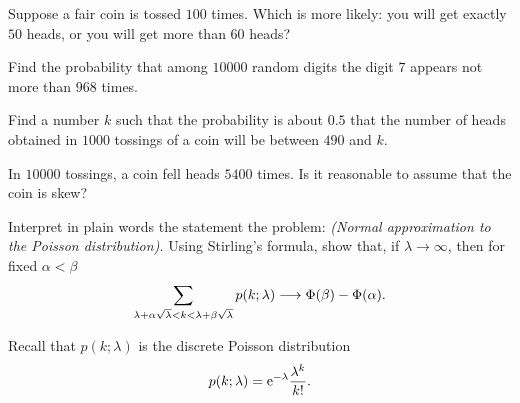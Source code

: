 \begin{problem}
  Suppose a fair coin is tossed \(100\) times. Which is more likely: you
  will get exactly \(50\) heads, or you will get more than \(60\) heads?
\end{problem}
\begin{solution}

\end{solution}

\begin{problem}[Handout 14, \# 11]
  Find the probability that among \(\num{10000}\) random digits the digit
  \(7\) appears not more than \(968\) times.
\end{problem}
\begin{solution}

\end{solution}

\begin{problem}[Handout 14, \# 12]
  Find a number \(k\) such that the probability is about \(0.5\) that the
  number of heads obtained in \(\num{1000}\) tossings of a coin will be
  between \(490\) and \(k\).
\end{problem}
\begin{solution}

\end{solution}

\begin{problem}[Handout 14, \# 13]
  In \(\num{10000}\) tossings, a coin fell heads \(\num{5400}\) times. Is
  it reasonable to assume that the coin is skew?
\end{problem}
\begin{solution}

\end{solution}

\begin{problem}[Handout 14, \# 14]
  Interpret in plain words the statement the problem: \emph{(Normal
    approximation to the Poisson distribution).} Using Stirling's formula,
  show that, if \(\lambda\to\infty\), then for fixed \(\alpha<\beta\)
  \[
    \sum_{\lambda+\alpha\sqrt{\lambda}<k<\lambda+\beta\sqrt{\lambda}}p(k;\lambda)
    \longrightarrow \Phi(\beta)-\Phi(\alpha).
  \]
\end{problem}
\begin{solution}
  Recall that \(p(k;\lambda)\) is the discrete Poisson distribution
  \[
    p(k;\lambda)=\mathrm{e}^{-\lambda}\frac{\lambda^k}{k!}.
  \]
\end{solution}

